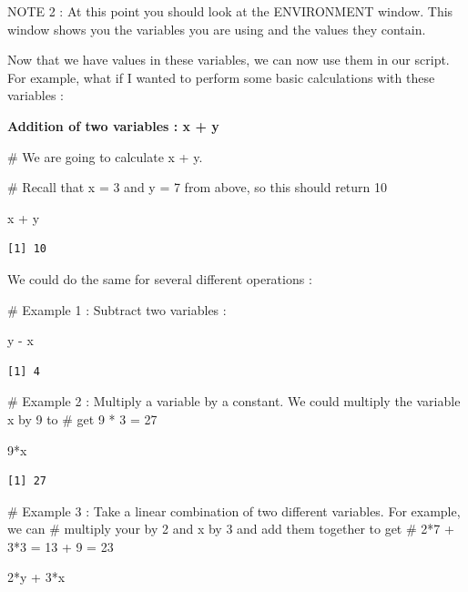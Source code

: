 \documentclass[
  letterpaper,
  DIV=11,
  numbers=noendperiod]{scrreprt}
\newenvironment{Shaded}{\begin{snugshade}}{\end{snugshade}}
\newcommand{\CommentTok}[1]{\textcolor[rgb]{0.37,0.37,0.37}{#1}}
\newcommand{\DecValTok}[1]{\textcolor[rgb]{0.68,0.00,0.00}{#1}}
\newcommand{\NormalTok}[1]{\textcolor[rgb]{0.00,0.23,0.31}{#1}}
\newcommand{\SpecialCharTok}[1]{\textcolor[rgb]{0.37,0.37,0.37}{#1}}
\begin{document}
NOTE 2 : At this point you should look at the ENVIRONMENT window. This
window shows you the variables you are using and the values they
contain.

Now that we have values in these variables, we can now use them in our
script. For example, what if I wanted to perform some basic calculations
with these variables :

\textbf{Addition of two variables : x + y}

\begin{Shaded}
\begin{Highlighting}[]
\CommentTok{\# We are going to calculate x + y. }

\CommentTok{\# Recall that x = 3 and y = 7 from above, so this should return 10}

\NormalTok{x }\SpecialCharTok{+}\NormalTok{ y}
\end{Highlighting}
\end{Shaded}

\begin{verbatim}
[1] 10
\end{verbatim}

We could do the same for several different operations :

\begin{Shaded}
\begin{Highlighting}[]
\CommentTok{\# Example 1 : Subtract two variables :}

\NormalTok{y }\SpecialCharTok{{-}}\NormalTok{ x}
\end{Highlighting}
\end{Shaded}

\begin{verbatim}
[1] 4
\end{verbatim}

\begin{Shaded}
\begin{Highlighting}[]
\CommentTok{\# Example 2 : Multiply a variable by a constant. We could multiply the variable x by 9 to}
\CommentTok{\# get 9 * 3 = 27}

\DecValTok{9}\SpecialCharTok{*}\NormalTok{x}
\end{Highlighting}
\end{Shaded}

\begin{verbatim}
[1] 27
\end{verbatim}

\begin{Shaded}
\begin{Highlighting}[]
\CommentTok{\# Example 3 : Take a linear combination of two different variables. For example, we can}
\CommentTok{\# multiply your by 2 and x by 3 and add them together to get }
\CommentTok{\# 2*7 + 3*3 = 13 + 9 = 23 }

\DecValTok{2}\SpecialCharTok{*}\NormalTok{y }\SpecialCharTok{+} \DecValTok{3}\SpecialCharTok{*}\NormalTok{x}
\end{Highlighting}
\end{Shaded}
\end{document}
